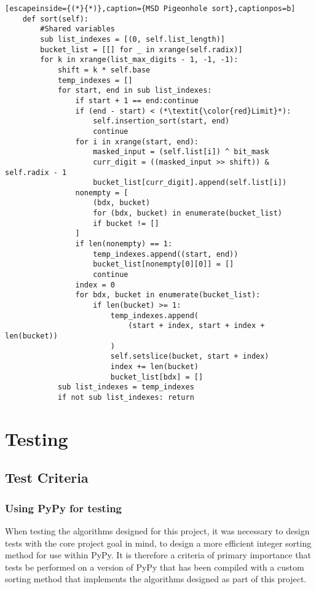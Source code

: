 \documentclass[12pt]{article}
\begin{document}
\begin{table}[H]
	\lstset{
		language=python,
    numbers=left,
    stepnumber=1,
    showstringspaces=false,
    tabsize=3,
    breaklines=true,
    breakatwhitespace=false,}
	\centering
	\begin{lstlisting}[escapeinside={(*}{*)},caption={MSD Pigeonhole sort},captionpos=b]
	def sort(self):
		#Shared variables
		sub list_indexes = [(0, self.list_length)]
		bucket_list = [[] for _ in xrange(self.radix)]
		for k in xrange(list_max_digits - 1, -1, -1):
			shift = k * self.base
			temp_indexes = []
			for start, end in sub list_indexes:
				if start + 1 == end:continue
				if (end - start) < (*\textit{\color{red}Limit}*):
					self.insertion_sort(start, end)
					continue
				for i in xrange(start, end):
					masked_input = (self.list[i]) ^ bit_mask
					curr_digit = ((masked_input >> shift)) & self.radix - 1
					bucket_list[curr_digit].append(self.list[i])
				nonempty = [
					(bdx, bucket)
					for (bdx, bucket) in enumerate(bucket_list)
					if bucket != []
				]
				if len(nonempty) == 1:
					temp_indexes.append((start, end))
					bucket_list[nonempty[0][0]] = []
					continue
				index = 0
				for bdx, bucket in enumerate(bucket_list):
					if len(bucket) >= 1:
						temp_indexes.append(
							(start + index, start + index + len(bucket))
						)
						self.setslice(bucket, start + index)
						index += len(bucket)
						bucket_list[bdx] = []
			sub list_indexes = temp_indexes
			if not sub list_indexes: return
\end{lstlisting}
\end{table}
\pagebreak
\section{Testing}
\subsection{Test Criteria}
\subsubsection{Using PyPy for testing}
When testing the algorithms designed for this project, it was necessary to design tests with the core project goal in mind, to design a more efficient integer sorting method for use within PyPy. It is therefore a criteria of primary importance that tests be performed on a version of PyPy that has been compiled with a custom sorting method that implements the algorithms designed as part of this project. 
\par
\end{document}
